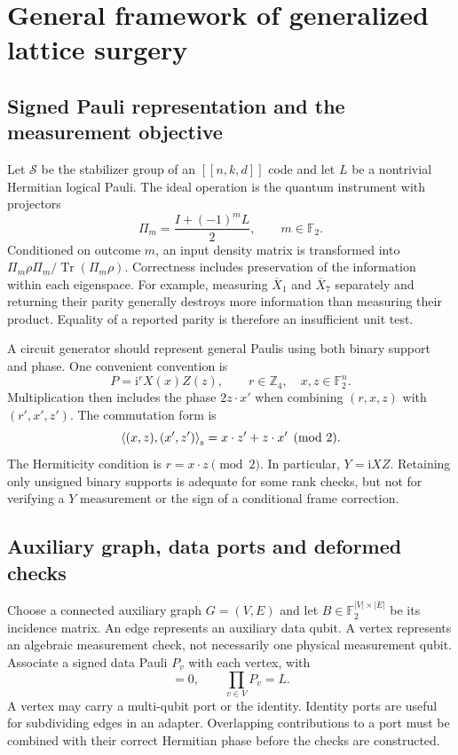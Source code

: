 \documentclass[11pt,a4paper]{article}
\newcommand{\F}{\mathbb{F}_2}
\newcommand{\lx}{\overline{X}}
\newcommand{\symp}[2]{\left\langle #1,#2\right\rangle_{\rm s}}
\begin{document}
\section{General framework of generalized lattice surgery}
\label{sec:framework}

\subsection{Signed Pauli representation and the measurement objective}

Let $\mathcal S$ be the stabilizer group of an $[[n,k,d]]$ code and let $L$ be a nontrivial Hermitian logical Pauli. The ideal operation is the quantum instrument with projectors
\begin{equation}
 \Pi_m=\frac{I+(-1)^m L}{2},\qquad m\in\F.
 \label{eq:projector}
\end{equation}
Conditioned on outcome $m$, an input density matrix is transformed into $\Pi_m\rho\Pi_m/\operatorname{Tr}(\Pi_m\rho)$. Correctness includes preservation of the information within each eigenspace. For example, measuring $\lx_1$ and $\lx_7$ separately and returning their parity generally destroys more information than measuring their product. Equality of a reported parity is therefore an insufficient unit test.

A circuit generator should represent general Paulis using both binary support and phase. One convenient convention is
\begin{equation}
 P=\mathrm{i}^{r}X(x)Z(z),\qquad r\in\mathbb Z_4,\quad x,z\in\F^n.
\end{equation}
Multiplication then includes the phase $2z\cdot x'$ when combining $(r,x,z)$ with $(r',x',z')$. The commutation form is
\begin{equation}
 \symp{(x,z)}{(x',z')}=x\cdot z'+z\cdot x'\pmod 2.
\end{equation}
The Hermiticity condition is $r=x\cdot z\pmod 2$. In particular, $Y=\mathrm{i}XZ$. Retaining only unsigned binary supports is adequate for some rank checks, but not for verifying a $Y$ measurement or the sign of a conditional frame correction.

\subsection{Auxiliary graph, data ports and deformed checks}

Choose a connected auxiliary graph $G=(V,E)$ and let $B\in\F^{|V|\times |E|}$ be its incidence matrix. An edge represents an auxiliary data qubit. A vertex represents an algebraic measurement check, not necessarily one physical measurement qubit. Associate a signed data Pauli $P_v$ with each vertex, with
\begin{equation}
 [P_v,P_u]=0,\qquad \prod_{v\in V}P_v=L.
 \label{eq:ports}
\end{equation}
A vertex may carry a multi-qubit port or the identity. Identity ports are useful for subdividing edges in an adapter. Overlapping contributions to a port must be combined with their correct Hermitian phase before the checks are constructed.
\end{document}
